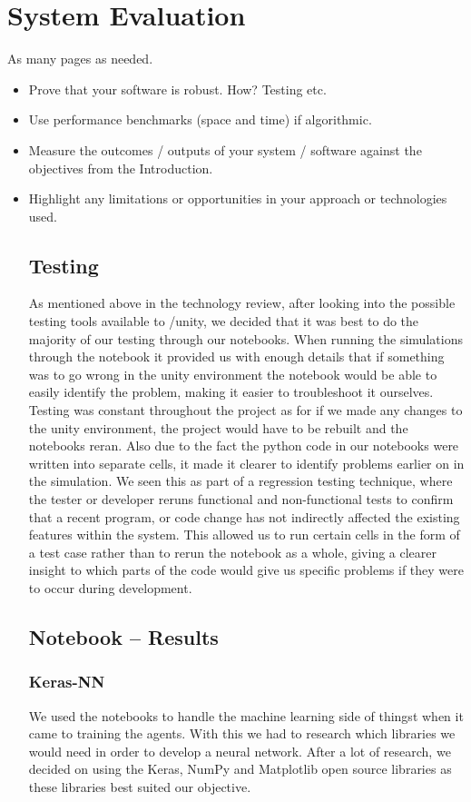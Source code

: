 
\chapter{System Evaluation}
As many pages as needed.
\begin{itemize}
\item Prove that your software is robust. How? Testing etc. 
\item Use performance benchmarks (space and time) if algorithmic.
\item Measure the outcomes / outputs of your system / software against the objectives from the Introduction.
\item Highlight any limitations or opportunities in your approach or technologies used.

\section{Testing}
As mentioned above in the technology review, after looking into the possible testing tools available to /unity, we decided that it was best to do the majority of our testing through our notebooks. When running the simulations through the notebook it provided us with enough details that if something was to go wrong in the unity environment the notebook would be able to easily identify the problem, making it easier to troubleshoot it ourselves. Testing was constant throughout the project as for if we made any changes to the unity environment, the project would have to be rebuilt and the notebooks reran. Also due to the fact the python code in our notebooks were written into separate cells, it made it clearer to identify problems earlier on in the simulation.  We seen this as part of a regression testing technique, where the tester or developer reruns functional and non-functional tests to confirm that a recent program, or code change has not indirectly affected the existing features within the system. This allowed us to run certain cells in the form of a test case rather than to rerun the notebook as a whole, giving a clearer insight to which parts of the code would give us specific problems if they were to occur during development.

\section{Notebook – Results}
\subsection{Keras-NN}
We used the notebooks to handle the machine learning side of thingst when it came to training the agents. 
With this we had to research which libraries we would need in order to develop a neural network. After a lot of research, we decided on using the Keras, NumPy and Matplotlib open source libraries as these libraries best suited our objective. 


\end{itemize}
